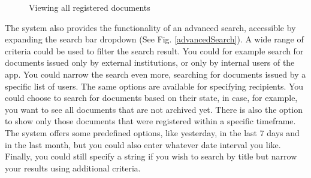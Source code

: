 \begin{figure}[ht]
    \centering
    \qquad
    \caption{Viewing all registered documents}
    \label{documentsTable}
\end{figure}

The system also provides the functionality of an advanced search, accessible by expanding the search bar dropdown (See Fig. \ref{advancedSearch}). A wide range of criteria could be used to filter the search result. You could for example search for documents issued only by external institutions, or only by internal users of the app. You could narrow the search even more, searching for documents issued by a specific list of users. The same options are available for specifying recipients. You could choose to search for documents based on their state, in case, for example, you want to see all documents that are not archived yet. There is also the option to show only those documents that were registered within a specific timeframe. The system offers some predefined options, like yesterday, in the last 7 days and in the last month, but you could also enter whatever date interval you like. Finally, you could still specify a string if you wish to search by title but narrow your results using additional criteria.

